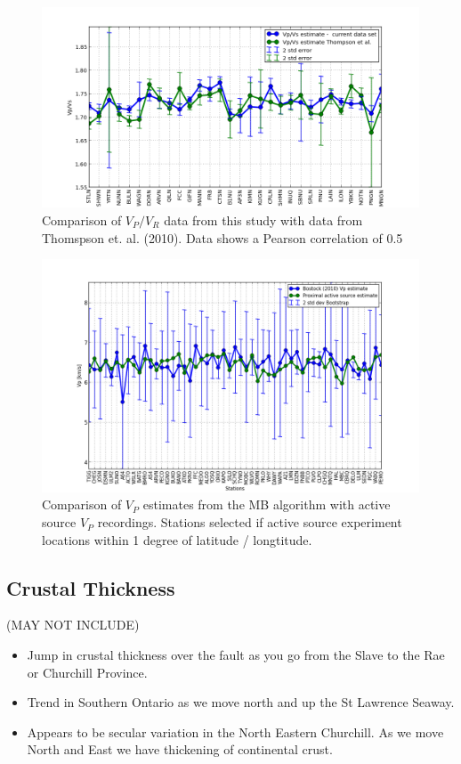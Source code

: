 \documentclass[draft, 12pt]{article}
\begin{document}
\begin{figure}
  \centering
    \includegraphics[width=\textwidth]{thompsonComparisonR}
  \caption{Comparison of $V_P / V_R$ data from this study with data from Thomspson et. al. (2010). Data shows a Pearson correlation of 0.5}
  \label{fig:thompsonCompR}
\end{figure}

\begin{figure}
  \centering
    \includegraphics[width=\textwidth]{activeSourceComparison}
  \caption{Comparison of $V_P$ estimates from the MB algorithm with active source $V_P$ recordings. Stations selected if active source experiment locations within 1 degree of latitude / longtitude.}
  \label{fig:activeComp}
\end{figure}

\subsection{Crustal Thickness}
 (MAY NOT INCLUDE)
\begin{itemize}
  \item Jump in crustal thickness over the fault as you go from the Slave to the Rae or Churchill Province.
  \item Trend in Southern Ontario as we move north and up the St Lawrence Seaway.
  \item Appears to be secular variation in the North Eastern Churchill. As we move North and East we have thickening of continental crust.
\end{itemize}
\end{document}
